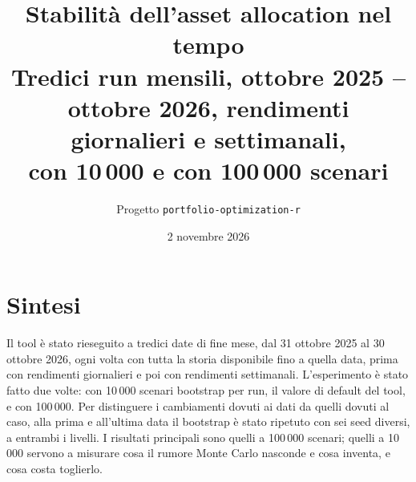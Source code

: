 \documentclass[11pt,a4paper]{article}
\title{Stabilit\`a dell'asset allocation nel tempo\\
\large Tredici run mensili, ottobre 2025 -- ottobre 2026, rendimenti giornalieri e settimanali,\\ con 10\,000 e con 100\,000 scenari}
\author{Progetto \texttt{portfolio-optimization-r}}
\date{2 novembre 2026}
\begin{document}
\maketitle

\section*{Sintesi}

Il tool \`e stato rieseguito a tredici date di fine mese, dal 31 ottobre 2025 al 30 ottobre 2026, ogni volta con tutta la storia disponibile fino a quella data, prima con rendimenti giornalieri e poi con rendimenti settimanali. L'esperimento \`e stato fatto due volte: con 10\,000 scenari bootstrap per run, il valore di default del tool, e con 100\,000. Per distinguere i cambiamenti dovuti ai dati da quelli dovuti al caso, alla prima e all'ultima data il bootstrap \`e stato ripetuto con sei seed diversi, a entrambi i livelli. I risultati principali sono quelli a 100\,000 scenari; quelli a 10\,000 servono a misurare cosa il rumore Monte Carlo nasconde e cosa inventa, e cosa costa toglierlo.
\end{document}
